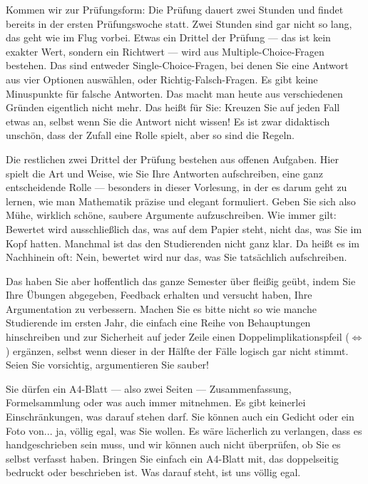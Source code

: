 \begin{spoken-clean}[01:20:27 - 01:22:57]
Kommen wir zur Prüfungsform: Die Prüfung dauert zwei Stunden und findet bereits in der ersten Prüfungswoche statt. Zwei Stunden sind gar nicht so lang, das geht wie im Flug vorbei. Etwas ein Drittel der Prüfung --- das ist kein exakter Wert, sondern ein Richtwert --- wird aus Multiple-Choice-Fragen bestehen. Das sind entweder Single-Choice-Fragen, bei denen Sie eine Antwort aus vier Optionen auswählen, oder Richtig-Falsch-Fragen. Es gibt keine Minuspunkte für falsche Antworten. Das macht man heute aus verschiedenen Gründen eigentlich nicht mehr. Das heißt für Sie: Kreuzen Sie auf jeden Fall etwas an, selbst wenn Sie die Antwort nicht wissen! Es ist zwar didaktisch unschön, dass der Zufall eine Rolle spielt, aber so sind die Regeln.

Die restlichen zwei Drittel der Prüfung bestehen aus offenen Aufgaben. Hier spielt die Art und Weise, wie Sie Ihre Antworten aufschreiben, eine ganz entscheidende Rolle --- besonders in dieser Vorlesung, in der es darum geht zu lernen, wie man Mathematik präzise und elegant formuliert. Geben Sie sich also Mühe, wirklich schöne, saubere Argumente aufzuschreiben. Wie immer gilt: Bewertet wird ausschließlich das, was auf dem Papier steht, nicht das, was Sie im Kopf hatten. Manchmal ist das den Studierenden nicht ganz klar. Da heißt es im Nachhinein oft:  Nein, bewertet wird nur das, was Sie tatsächlich aufschreiben.

Das haben Sie aber hoffentlich das ganze Semester über fleißig geübt, indem Sie Ihre Übungen abgegeben, Feedback erhalten und versucht haben, Ihre Argumentation zu verbessern. Machen Sie es bitte nicht so wie manche Studierende im ersten Jahr, die einfach eine Reihe von Behauptungen hinschreiben und zur Sicherheit auf jeder Zeile einen Doppelimplikationspfeil ($\iff$) ergänzen, selbst wenn dieser in der Hälfte der Fälle logisch gar nicht stimmt. Seien Sie vorsichtig, argumentieren Sie sauber!
\end{spoken-clean}

\begin{spoken-clean}[01:22:57 - 01:23:49]
Sie dürfen ein A4-Blatt --- also zwei Seiten --- Zusammenfassung, Formelsammlung oder was auch immer mitnehmen. Es gibt keinerlei Einschränkungen, was darauf stehen darf. Sie können auch ein Gedicht oder ein Foto von... ja, völlig egal, was Sie wollen. Es wäre lächerlich zu verlangen, dass es handgeschrieben sein muss, und wir können auch nicht überprüfen, ob Sie es selbst verfasst haben. Bringen Sie einfach ein A4-Blatt mit, das doppelseitig bedruckt oder beschrieben ist. Was darauf steht, ist uns völlig egal.
\end{spoken-clean}

